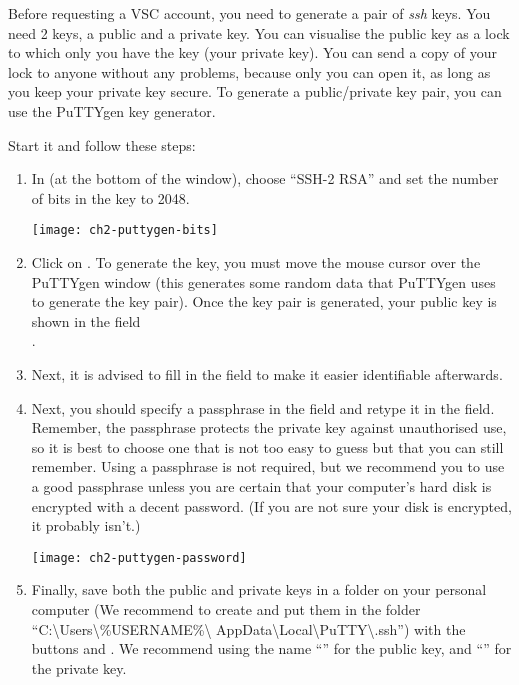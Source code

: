   Before requesting a VSC account, you need to generate a pair of \emph{ssh}
  keys. You need 2 keys, a public and a private key. You can visualise the public
  key as a lock to which only you have the key (your private key). You can send
  a copy of your lock to anyone without any problems, because only you can
  open it, as long as you keep your private key secure.
  To generate a public/private key pair, you can use the PuTTYgen key generator.

  Start  it and follow these steps:

  \begin{enumerate}
    \item  In  (at the bottom of the window), choose
      ``SSH-2 RSA'' and set the number of bits in the key to 2048.

    \begin{center}
    \texttt{[image: ch2-puttygen-bits]}
    \end{center}

    \item  Click on . To generate the key, you must move
      the mouse cursor over the PuTTYgen window (this generates some random
      data that PuTTYgen uses to generate the key pair). Once the key pair is
      generated, your public key is shown in the field \\
      .
    \item  Next, it is advised to fill in the  field
      to make it easier identifiable afterwards.
    \item  Next, you should specify a passphrase in the 
      field and retype it in the  field.
      Remember, the passphrase protects the private key against unauthorised
      use, so it is best to choose one that is not too easy to guess but that
      you can still remember.
      Using a passphrase is not required, but we recommend you to use a good
      passphrase unless you are certain that your computer's hard disk is
      encrypted with a decent password. (If you are not sure your disk is
      encrypted, it probably isn't.)

    \begin{center}
    \texttt{[image: ch2-puttygen-password]}
    \end{center}

    \item  Finally, save both the public and private keys in a folder on your
      personal computer (We recommend to create and put them in the folder
      ``C:\textbackslash Users\textbackslash \%USERNAME\%\textbackslash
      AppData\textbackslash Local\textbackslash PuTTY\textbackslash .ssh'')
      with the buttons  and .
      We recommend using the name ``'' for the public key,
      and ``'' for the private key.
  \end{enumerate}

